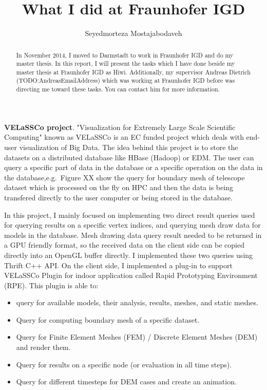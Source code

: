 \documentclass[]{report}
\title{What I did at Fraunhofer IGD}
\author{Seyedmorteza Mostajabodaveh}
\begin{document}
\maketitle

\begin{abstract}
In November 2014, I moved to Darmstadt to work in Fraunhofer IGD and do my master thesis. In this report, I will present the tasks which I have done beside my master thesis at Fraunhofer IGD as Hiwi. Additionally, my supervisor Andreas Dietrich (TODO:AndreasEmailAddress) which was working at Fraunhofer IGD before was directing me toward these tasks. You can contact him for more information.
\end{abstract}

\textbf{VELaSSCo project}. "Visualization for Extremely Large Scale Scientific Computing" known as VELaSSCo is an EC funded project which deals with end-user visualization of Big Data. The idea behind this project is to store the datasets on a distributed database like HBase (Hadoop) or EDM. The user can query a specific part of data in the database or a specific operation on the data in the database,e.g.~Figure XX show the query for boundary mesh of telescope dataset which is processed on the fly on HPC and then the data is being transfered directly to the user computer or being stored in the database.

In this project, I mainly focused on implementing two direct result queries used for querying results on a specific vertex indices, and querying mesh draw data for models in the database. Mesh drawing data query result needed to be returned in a GPU friendly format, so the received data on the client side can be copied directly into an OpenGL buffer directly. I implemented these two queries using Thrift C++ API. On the client side, I implemented a plug-in to support VELaSSCo Plugin for indoor application called Rapid Prototyping Environment (RPE). This plugin is able to:

\begin{itemize}
	\item query for available models, their analysis, results, meshes, and static meshes.
	\item Query for computing boundary mesh of a specific dataset.
	\item Query for Finite Element Meshes (FEM) / Discrete Element Meshes (DEM) and render them.
	\item Query for results on a specific node (or evaluation in all time steps).
	\item Query for different timesteps for DEM cases and create an animation.
\end{itemize}
\end{document}
